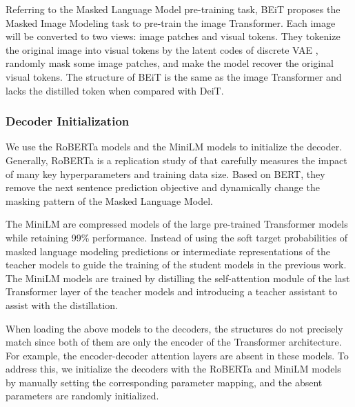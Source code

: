 \documentclass[letterpaper]{article} \usepackage{aaai23}  \usepackage{times}  \usepackage{helvet}  \usepackage{courier}  \usepackage[hyphens]{url}  \usepackage{graphicx} \urlstyle{rm} \def\UrlFont{\rm}  \usepackage{natbib}  \usepackage{caption} \frenchspacing  \setlength{\pdfpagewidth}{8.5in} \setlength{\pdfpageheight}{11in} \usepackage{algorithm}
\begin{document}
Referring to the Masked Language Model pre-training task, BEiT proposes the Masked Image Modeling task to pre-train the image Transformer. Each image will be converted to two views: image patches and visual tokens. They tokenize the original image into visual tokens by the latent codes of discrete VAE \cite{ramesh2021zero}, randomly mask some image patches, and make the model recover the original visual tokens. The structure of BEiT is the same as the image Transformer and lacks the distilled token when compared with DeiT.





\subsubsection{Decoder Initialization}

We use the RoBERTa \cite{liu2019roberta} models and the MiniLM \cite{wang2020minilm} models to initialize the decoder. Generally, RoBERTa is a replication study of \cite{devlin2019bert} that carefully measures the impact of many key hyperparameters and training data size. Based on BERT, they remove the next sentence prediction objective and dynamically change the masking pattern of the Masked Language Model. 

The MiniLM are compressed models of the large pre-trained Transformer models while retaining 99\% performance. Instead of using the soft target probabilities of masked language modeling predictions or intermediate representations of the teacher models to guide the training of the student models in the previous work. The MiniLM models are trained by distilling the self-attention module of the last Transformer layer of the teacher models and introducing a teacher assistant to assist with the distillation. 

When loading the above models to the decoders, the structures do not precisely match since both of them are only the encoder of the Transformer architecture. For example, the encoder-decoder attention layers are absent in these models.
To address this, we initialize the decoders with the RoBERTa and MiniLM models by manually setting the corresponding parameter mapping, and the absent parameters are randomly initialized.
\end{document}
